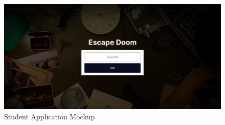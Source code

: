 \begin{figure}[h!]
    \centering
    \includegraphics[width=\linewidth]{images/StudentJoin.png}
    \caption{Student Application Mockup}
    \label{fig:lector:portal}
\end{figure}